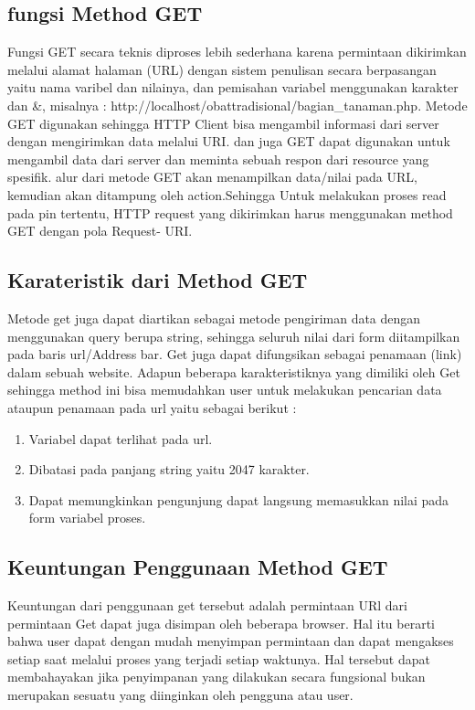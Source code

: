 \subsection{fungsi Method GET}
Fungsi GET secara teknis diproses lebih sederhana karena permintaan dikirimkan melalui alamat halaman (URL) dengan sistem 
penulisan secara berpasangan yaitu nama varibel dan nilainya, dan pemisahan variabel menggunakan karakter dan &, misalnya :
http://localhost/obattradisional/bagian_tanaman.php. Metode GET digunakan sehingga HTTP Client bisa mengambil informasi dari 
server dengan mengirimkan data melalui URI.
dan juga GET dapat digunakan untuk mengambil data dari server dan meminta sebuah respon dari resource yang spesifik.  alur dari 
metode GET akan menampilkan data/nilai pada URL, kemudian akan ditampung oleh action.Sehingga Untuk melakukan proses read pada 
pin tertentu, HTTP request yang dikirimkan harus menggunakan method GET dengan pola Request- URI.

\subsection{Karateristik dari Method GET}
Metode get juga dapat diartikan sebagai metode pengiriman data dengan menggunakan query berupa string, sehingga seluruh nilai dari form 
diitampilkan pada baris url/Address bar. Get juga dapat difungsikan sebagai penamaan (link) dalam sebuah website. Adapun beberapa 
karakteristiknya yang dimiliki oleh Get sehingga method ini bisa memudahkan user untuk melakukan pencarian data ataupun penamaan pada 
url yaitu sebagai berikut :
\begin{enumerate}
\item Variabel dapat terlihat pada url.
\item Dibatasi pada panjang string yaitu 2047 karakter.
\item Dapat memungkinkan pengunjung dapat langsung memasukkan nilai pada form variabel proses.
\end{enumerate}

\subsection{Keuntungan Penggunaan Method GET}
Keuntungan dari penggunaan get tersebut adalah permintaan URl dari permintaan Get dapat juga disimpan oleh beberapa browser.
Hal itu berarti bahwa user dapat dengan mudah menyimpan permintaan dan dapat mengakses setiap saat melalui proses yang terjadi setiap 
waktunya. Hal tersebut dapat membahayakan jika penyimpanan yang dilakukan secara fungsional bukan merupakan sesuatu yang diinginkan oleh 
pengguna atau user.

